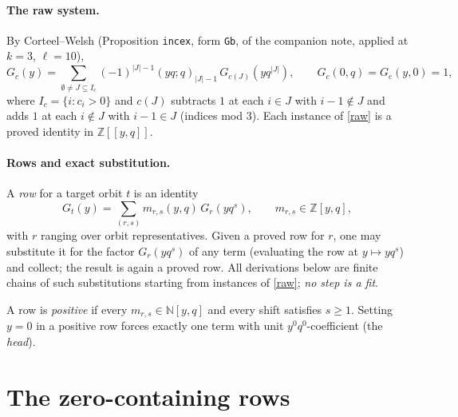 \documentclass[11pt]{article}
\newcommand{\NN}{\mathbb{N}}
\newcommand{\ZZ}{\mathbb{Z}}
\begin{document}
\paragraph{The raw system.} By Corteel--Welsh (Proposition \texttt{incex}, form
\texttt{Gb}, of the companion note, applied at $k=3$, $\ell=10$),
\begin{equation}\label{raw}
G_c(y)=\sum_{\emptyset\ne J\subseteq I_c}(-1)^{|J|-1}(yq;q)_{|J|-1}\,
G_{c(J)}(yq^{|J|}),\qquad G_c(0,q)=G_c(y,0)=1,
\end{equation}
where $I_c=\{i:c_i>0\}$ and $c(J)$ subtracts $1$ at each $i\in J$ with
$i-1\notin J$ and adds $1$ at each $i\notin J$ with $i-1\in J$ (indices mod $3$).
Each instance of \eqref{raw} is a proved identity in $\ZZ[[y,q]]$.

\paragraph{Rows and exact substitution.} A \emph{row} for a target orbit $t$ is an
identity
\[
G_t(y)=\sum_{(r,s)} m_{r,s}(y,q)\,G_r(yq^{s}),\qquad m_{r,s}\in\ZZ[y,q],
\]
with $r$ ranging over orbit representatives. Given a proved row for $r$, one may
substitute it for the factor $G_r(yq^{s})$ of any term (evaluating the row at
$y\mapsto yq^{s}$) and collect; the result is again a proved row. All derivations
below are finite chains of such substitutions starting from instances of
\eqref{raw}; \emph{no step is a fit}.

A row is \emph{positive} if every $m_{r,s}\in\NN[y,q]$ and every shift satisfies
$s\ge1$. Setting $y=0$ in a positive row forces exactly one term with unit
$y^0q^0$-coefficient (the \emph{head}).

\section{The zero-containing rows}
\end{document}
